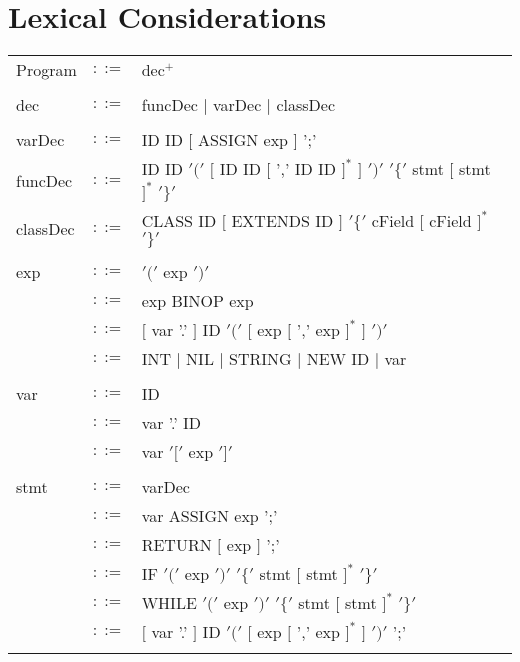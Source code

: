 \documentclass{article}
\begin{document}
\section{Lexical Considerations}
\begin{table}[h]
\centering
\begin{tabular}{ l c l }
  Program     & $::=$ & dec$^{+}$                                           \\ \\

  dec         & $::=$ & funcDec $|$ varDec $|$ classDec                       \\ \\

  varDec      & $::=$ & ID ID $[$ ASSIGN exp $]$ ';'                              \\
  funcDec     & $::=$ & ID ID $'('$ $[$ ID ID $[$ ',' ID ID $]^{*}$ $]$ $')'$
                              $'\{'$ stmt   $[$ stmt $]^{*}$ $'\}'$           \\
  classDec    & $::=$ & CLASS ID $[$ EXTENDS ID $]$
                               $'\{'$ cField $[$ cField $]^{*}$ $'\}'$      \\ \\

  exp         & $::=$ & $'('$ exp $')'$                                     \\
              & $::=$ & exp BINOP exp                                       \\
              & $::=$ & $[$ var '.' $]$ ID $'('$ $[$ exp $[$ ',' exp $]^{*}$ $]$ $')'$ \\
              & $::=$ & INT $|$ NIL $|$ STRING $|$ NEW ID $|$ var           \\ \\
  var         & $::=$ & ID                                                        \\
              & $::=$ & var '.' ID                                                \\
              & $::=$ & var $'['$ exp $']'$                                       \\ \\
  
  stmt        & $::=$ & varDec                                                             \\
              & $::=$ & var ASSIGN exp ';'                                                 \\
              & $::=$ & RETURN $[$ exp $]$ ';'                                             \\
              & $::=$ & IF $'('$ exp $')'$ $'\{'$ stmt $[$ stmt $]^{*}$ $'\}'$             \\
              & $::=$ & WHILE $'('$ exp $')'$ $'\{'$ stmt $[$ stmt $]^{*}$ $'\}'$          \\
              & $::=$ & $[$ var '.' $]$ ID $'('$ $[$ exp $[$ ',' exp $]^{*}$ $]$ $')'$ ';' \\ \\


\end{tabular}
\end{table}
\end{document}
